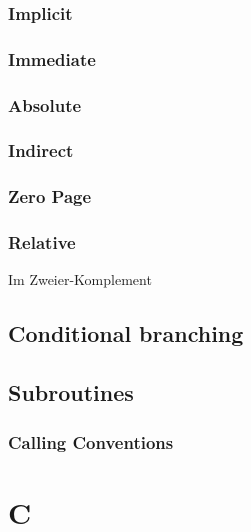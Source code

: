 \documentclass{report}
\begin{document}
\subsection{Implicit}
\subsection{Immediate}
\subsection{Absolute}
\subsection{Indirect}
\subsection{Zero Page}
\subsection{Relative}
Im Zweier-Komplement 

\section{Conditional branching}

\section{Subroutines}
\subsection{Calling Conventions}

\chapter{C}
\end{document}

